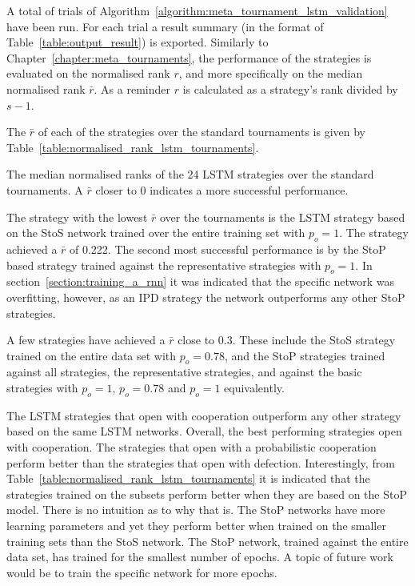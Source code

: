 A total of \metatournamentslstm trials of
Algorithm~\ref{algorithm:meta_tournament_lstm_validation} have been run. For
each trial a result summary (in the format of Table~\ref{table:output_result})
is exported. Similarly to Chapter~\ref{chapter:meta_tournaments}, the
performance of the strategies is evaluated on the normalised rank \(r\), and
more specifically on the median normalised rank \(\bar{r}\). As a reminder \(r\)
is calculated as a strategy's rank divided by \(s-1\).

The \(\bar{r}\) of each of the \lstmstrategies strategies over the \metatournamentslstm
standard tournaments is given by Table~\ref{table:normalised_rank_lstm_tournaments}.

\begin{table}[!htbp]
    \begin{center}
    \resizebox{.8\textwidth}{!}{
        
    }
\end{center}
\caption{The median normalised ranks of the 24 LSTM strategies over the standard
tournaments. A \(\bar{r}\) closer to 0 indicates a more successful performance.}
\label{table:normalised_rank_lstm_tournaments}
\end{table}

The strategy with the lowest \(\bar{r}\) over the \metatournamentslstm
tournaments is the LSTM strategy based on the StoS network trained over the entire
training set with \(p_o=1\). The strategy achieved a \(\bar{r}\) of 0.222. The
second most successful performance is by the StoP based strategy trained against
the representative strategies with \(p_o=1\). In
section~\ref{section:training_a_rnn} it was indicated that the specific network
was overfitting, however, as an IPD strategy the network outperforms any other
StoP strategies.

A few strategies have achieved a \(\bar{r}\)
close to 0.3. These include the StoS strategy trained on the entire data set
with \(p_o=0.78\), and the StoP strategies trained against all strategies,
the representative strategies, and against the basic strategies with \(p_o=1\),
\(p_o=0.78\) and \(p_o=1\) equivalently.

The LSTM strategies that open with cooperation outperform any other strategy
based on the same LSTM networks. Overall, the best performing
strategies open with cooperation. The strategies that open with a probabilistic
cooperation perform better than the strategies that open with defection.
Interestingly, from Table~\ref{table:normalised_rank_lstm_tournaments} it is
indicated that the strategies trained on the subsets perform better when they
are based on the StoP model. There is no intuition as to why that is. The
StoP networks have more learning parameters and yet they perform better when
trained on the smaller training sets than the StoS network. The StoP
network, trained against the entire data set, has trained for the smallest
number of epochs. A topic of future work would be to train the specific network
for more epochs.

